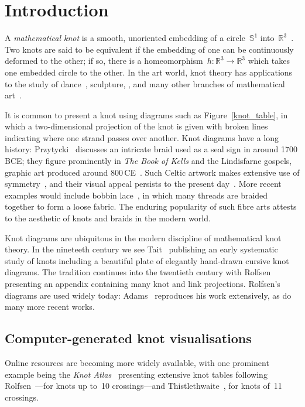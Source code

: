 \documentclass{birkjour}
\theoremstyle{definition}
\theoremstyle{remark}
\numberwithin{equation}{section}
\begin{document}
\section{Introduction}

A {\em mathematical knot} is a smooth, unoriented embedding of a
circle~$\mathbb{S}^1$ into~$\mathbb{R}^3$~\cite{manturov2004,adams2004}.  Two
knots are said to be equivalent if the embedding of one can be
continuously deformed to the other; if so, there is a
homeomorphism~$h\colon\mathbb{R}^3\longrightarrow\mathbb{R}^3$ which
takes one embedded circle to the other.  In the art world, knot theory
has applications to the study of dance~\cite{khorami2020}, sculpture,
\cite{bosch2010, widmark2020}, and many other branches of mathematical
art~\cite{hart2008}.

It is common to present a knot using diagrams such as
Figure~\ref{knot_table}, in which a two-dimensional projection of the
knot is given with broken lines indicating where one strand passes
over another.  Knot diagrams have a long history:
Przytycki~\cite{przytycki1998} discusses an intricate braid used as a
seal sign in around 1700\,BCE; they figure prominently in {\em The
  Book of Kells} and the Lindisfarne gospels, graphic art produced
around 800\,CE~\cite{bain1973}.  Such Celtic artwork makes extensive
use of symmetry~\cite{cromwell2008}, and their visual appeal persists
to the present day~\cite{antonsen2021}.  More recent examples would
include bobbin lace~\cite{irvine2020}, in which many threads are
braided together to form a loose fabric.  The enduring popularity of
such fibre arts attests to the aesthetic of knots and braids in the
modern world.

Knot diagrams are ubiquitous in the modern discipline of mathematical
knot theory.  In the nineteeth century we see Tait~\cite{tait1884}
publishing an early systematic study of knots including a beautiful
plate of elegantly hand-drawn cursive knot diagrams.  The tradition
continues into the twentieth century with Rolfsen~\cite{rolfsen1976}
presenting an appendix containing many knot and link projections.
Rolfsen's diagrams are used widely today: Adams~\cite{adams2004}
reproduces his work extensively, as do many more recent works.

\subsection{Computer-generated knot visualisations}

Online
resources are becoming more widely available, with one prominent
example being the {\em Knot Atlas}~\cite{knot_atlas} presenting
extensive knot tables following Rolfsen~\cite{rolfsen1976}---for knots
up to~10 crossings---and Thistlethwaite~\cite{hoste1998}, for knots
of~11 crossings.
\end{document}
